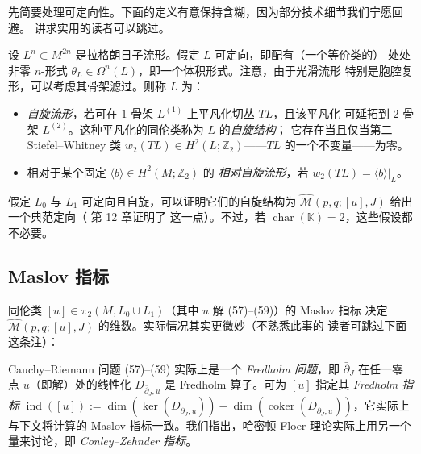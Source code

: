 先简要处理可定向性。下面的定义有意保持含糊，因为部分技术细节我们宁愿回避。
讲求实用的读者可以跳过。

\begin{Def}\label{def:5.13}
设 $L^n\subset M^{2n}$ 是拉格朗日子流形。假定 $L$ 可定向，即配有（一个等价类的）
处处非零 $n$-形式 $\theta_L\in\Omega^n(L)$，即一个体积形式。注意，由于光滑流形
特别是胞腔复形，可以考虑其骨架滤过。则称 $L$ 为：
\begin{itemize}
  \item \emph{自旋流形}，若可在 $1$-骨架 $L^{(1)}$ 上平凡化切丛 $TL$，且该平凡化
  可延拓到 $2$-骨架 $L^{(2)}$。这种平凡化的同伦类称为 $L$ 的\emph{自旋结构}；
  它存在当且仅当第二 Stiefel--Whitney 类
  $w_2(TL)\in H^2(L;\mathbb Z_2)$——$TL$ 的一个不变量——为零。
  \item 相对于某个固定 $\langle b\rangle\in H^2(M;\mathbb Z_2)$ 的
  \emph{相对自旋流形}，若 $w_2(TL)=\langle b\rangle|_L$。
\end{itemize}
\end{Def}


假定 $L_0$ 与 $L_1$ 可定向且自旋，可以证明它们的自旋结构为
$\widehat{\mathcal M}(p,q;[u],J)$ 给出一个典范定向（\cite{Sei08} 第 12 章证明了
这一点）。不过，若 $\operatorname{char}(\mathbb K)=2$，这些假设都不必要。

\medskip
\noindent{}
\medskip

\subsection{Maslov 指标}\label{sec:5.4}

同伦类 $[u]\in\pi_2(M,L_0\cup L_1)$（其中 $u$ 解 (57)--(59)）的 Maslov 指标
决定 $\widehat{\mathcal M}(p,q;[u],J)$ 的维数。实际情况其实更微妙（不熟悉此事的
读者可跳过下面这条注）：

\begin{Rem}\label{rem:5.14}
Cauchy--Riemann 问题 (57)--(59) 实际上是一个 \emph{Fredholm 问题}，即
$\bar\partial_J$ 在任一零点 $u$（即解）处的线性化 $D_{\bar\partial_J,u}$ 是
Fredholm 算子。可为 $[u]$ 指定其 \emph{Fredholm 指标}
$\operatorname{ind}([u]):=\dim(\ker(D_{\bar\partial_J,u}))
-\dim(\operatorname{coker}(D_{\bar\partial_J,u}))$，它实际上与下文将计算的
Maslov 指标一致。我们指出，哈密顿 Floer 理论实际上用另一个量来讨论，即
\emph{Conley--Zehnder 指标}。
\end{Rem}

